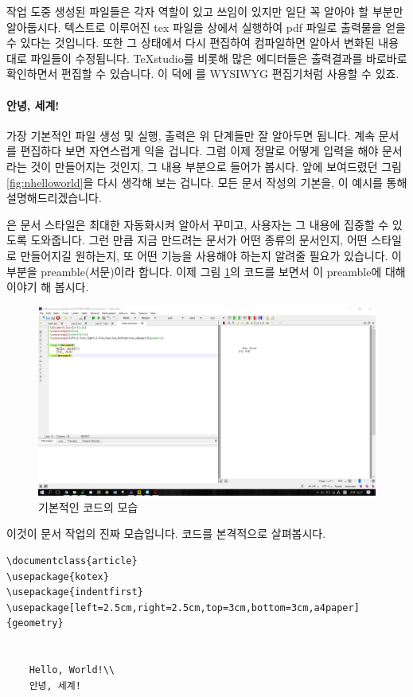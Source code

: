 작업 도중 생성된 파일들은 각자 역할이 있고 쓰임이 있지만 일단 꼭 알아야 할 부분만 알아둡시다. 텍스트로 이루어진 tex 파일을 \lt 상에서 실행하여 pdf 파일로 출력물을 얻을 수 있다는 것입니다. 또한 그 상태에서 다시 편집하여 컴파일하면 알아서 변화된 내용대로 파일들이 수정됩니다. TeXstudio를 비롯해 많은 에디터들은 출력결과를 바로바로 확인하면서 편집할 수 있습니다. 이 덕에 \lt 를 WYSIWYG 편집기처럼 사용할 수 있죠.

\paragraph{안녕, 세계!}
가장 기본적인 파일 생성 및 실행, 출력은 위 단계들만 잘 알아두면 됩니다. 계속 문서를 편집하다 보면 자연스럽게 익을 겁니다. 그럼 이제 정말로 어떻게 입력을 해야 문서라는 것이 만들어지는 것인지, 그 내용 부분으로 들어가 봅시다. 앞에 보여드렸던 그림 \ref{fig:nhelloworld}을 다시 생각해 보는 겁니다. 모든 \lt 문서 작성의 기본을, 이 예시를 통해 설명해드리겠습니다.

\lt 은 문서 스타일은 최대한 자동화시켜 알아서 꾸미고, 사용자는 그 내용에 집중할 수 있도록 도와줍니다. 그런 만큼 지금 만드려는 문서가 어떤 종류의 문서인지, 어떤 스타일로 만들어지길 원하는지, 또 어떤 기능을 사용해야 하는지 알려줄 필요가 있습니다. 이 부분을 preamble(서문)이라 합니다. 이제 그림 \ref{fig:helloworld}의 코드를 보면서 이 preamble에 대해 이야기 해 봅시다.

\begin{figure}[h]
	\includegraphics[width=\textwidth]{figures/helloworld.png}
	\caption{기본적인 코드의 모습\label{fig:helloworld}}
\end{figure}

이것이 \lt 문서 작업의 진짜 모습입니다. 코드를 본격적으로 살펴봅시다.

\newpage
\begin{Verbatim}[frame=single]
\documentclass{article}
\usepackage{kotex}
\usepackage{indentfirst}
\usepackage[left=2.5cm,right=2.5cm,top=3cm,bottom=3cm,a4paper]{geometry}
	

	Hello, World!\\
	안녕, 세계!

\end{Verbatim}

